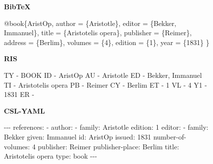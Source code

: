 \documentclass[
  12pt,
  a4paper,
  oneside,
  numbers=noenddot,
  titlepage,
  toclink=all,
  toc=bibliography]{scrbook}
\newenvironment{Shaded}{\begin{snugshade}}{\end{snugshade}}
\newcommand{\AttributeTok}[1]{\textcolor[rgb]{0.40,0.45,0.13}{#1}}
\newcommand{\DataTypeTok}[1]{\textcolor[rgb]{0.68,0.00,0.00}{#1}}
\newcommand{\DecValTok}[1]{\textcolor[rgb]{0.68,0.00,0.00}{#1}}
\newcommand{\FunctionTok}[1]{\textcolor[rgb]{0.28,0.35,0.67}{#1}}
\newcommand{\KeywordTok}[1]{\textcolor[rgb]{0.00,0.23,0.31}{#1}}
\newcommand{\NormalTok}[1]{\textcolor[rgb]{0.00,0.23,0.31}{#1}}
\newcommand{\OtherTok}[1]{\textcolor[rgb]{0.00,0.23,0.31}{#1}}
\newcommand{\PreprocessorTok}[1]{\textcolor[rgb]{0.68,0.00,0.00}{#1}}
\newcommand{\VariableTok}[1]{\textcolor[rgb]{0.07,0.07,0.07}{#1}}
\theoremstyle{definition}
\theoremstyle{definition}
\theoremstyle{definition}
\theoremstyle{plain}
\theoremstyle{plain}
\theoremstyle{plain}
\theoremstyle{plain}
\theoremstyle{plain}
\theoremstyle{remark}
\begin{document}
\hypertarget{bib-sample}{}
\begin{figure}

\leavevmode{}%
\textbf{BibTeX}

\begin{Shaded}
\begin{Highlighting}[numbers=left,,]
\VariableTok{@book}\NormalTok{\{}\OtherTok{AristOp}\NormalTok{,}
\DataTypeTok{author}\NormalTok{ = \{Aristotle\},}
\DataTypeTok{editor}\NormalTok{ = \{Bekker, Immanuel\},}
\DataTypeTok{title}\NormalTok{ = \{Aristotelis opera\},}
\DataTypeTok{publisher}\NormalTok{ = \{Reimer\},}
\DataTypeTok{address}\NormalTok{ = \{Berlim\},}
\DataTypeTok{volumes}\NormalTok{ = \{4\},}
\DataTypeTok{edition}\NormalTok{ = \{1\},}
\DataTypeTok{year}\NormalTok{ = \{1831\}}
\NormalTok{\}}
\end{Highlighting}
\end{Shaded}

\textbf{RIS}

\begin{Shaded}
\begin{Highlighting}[numbers=left,,]
\NormalTok{TY  {-} BOOK}
\NormalTok{ID  {-} AristOp}
\NormalTok{AU  {-} Aristotle}
\NormalTok{ED  {-} Bekker, Immanuel}
\NormalTok{TI  {-} Aristotelis opera}
\NormalTok{PB  {-} Reimer}
\NormalTok{CY  {-} Berlim}
\NormalTok{ET  {-} 1}
\NormalTok{VL  {-} 4}
\NormalTok{Y1  {-} 1831}
\NormalTok{ER  {-}}
\end{Highlighting}
\end{Shaded}

\hypertarget{second-column}{}

\leavevmode{}%
\textbf{CSL-YAML}

\begin{Shaded}
\begin{Highlighting}[numbers=left,,]
\PreprocessorTok{{-}{-}{-}}
\FunctionTok{references}\KeywordTok{:}
\KeywordTok{{-}}\AttributeTok{ }\FunctionTok{author}\KeywordTok{:}
\AttributeTok{  }\KeywordTok{{-}}\AttributeTok{ }\FunctionTok{family}\KeywordTok{:}\AttributeTok{ Aristotle}
\AttributeTok{  }\FunctionTok{edition}\KeywordTok{:}\AttributeTok{ }\DecValTok{1}
\AttributeTok{  }\FunctionTok{editor}\KeywordTok{:}
\AttributeTok{  }\KeywordTok{{-}}\AttributeTok{ }\FunctionTok{family}\KeywordTok{:}\AttributeTok{ Bekker}
\AttributeTok{    }\FunctionTok{given}\KeywordTok{:}\AttributeTok{ Immanuel}
\AttributeTok{  }\FunctionTok{id}\KeywordTok{:}\AttributeTok{ AristOp}
\AttributeTok{  }\FunctionTok{issued}\KeywordTok{:}\AttributeTok{ }\DecValTok{1831}
\AttributeTok{  }\FunctionTok{number{-}of{-}volumes}\KeywordTok{:}\AttributeTok{ }\DecValTok{4}
\AttributeTok{  }\FunctionTok{publisher}\KeywordTok{:}\AttributeTok{ Reimer}
\AttributeTok{  }\FunctionTok{publisher{-}place}\KeywordTok{:}\AttributeTok{ Berlim}
\AttributeTok{  }\FunctionTok{title}\KeywordTok{:}\AttributeTok{ Aristotelis opera}
\AttributeTok{  }\FunctionTok{type}\KeywordTok{:}\AttributeTok{ book}
\PreprocessorTok{{-}{-}{-}}
\end{Highlighting}
\end{Shaded}

\end{figure}
\end{document}
